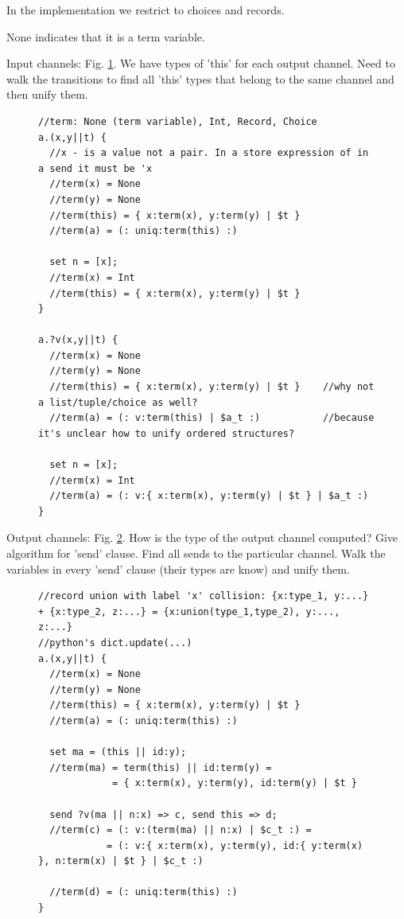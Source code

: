 In the implementation we restrict to choices and records.

None indicates that it is a term variable.


Input channels: Fig. \ref{a}.
We have types of 'this' for each output channel.
Need to walk the transitions to find all 'this' types that belong to the same channel and then unify them.
\begin{figure}[h!]
\begin{lstlisting}
//term: None (term variable), Int, Record, Choice
a.(x,y||t) {
  //x - is a value not a pair. In a store expression of in a send it must be 'x
  //term(x) = None
  //term(y) = None
  //term(this) = { x:term(x), y:term(y) | $t }
  //term(a) = (: uniq:term(this) :)

  set n = [x];
  //term(x) = Int
  //term(this) = { x:term(x), y:term(y) | $t }
}

a.?v(x,y||t) {
  //term(x) = None
  //term(y) = None
  //term(this) = { x:term(x), y:term(y) | $t }    //why not a list/tuple/choice as well?
  //term(a) = (: v:term(this) | $a_t :)           //because it's unclear how to unify ordered structures?

  set n = [x];
  //term(x) = Int
  //term(a) = (: v:{ x:term(x), y:term(y) | $t } | $a_t :)
}
\end{lstlisting}
\label{a}
\end{figure}

Output channels: Fig. \ref{b}.
How is the type of the output channel computed? Give algorithm for 'send' clause.
Find all sends to the particular channel.
Walk the variables in every 'send' clause (their types are know) and unify them.
\begin{figure}[h!]
\begin{lstlisting}[frame=single]
//record union with label 'x' collision: {x:type_1, y:...} + {x:type_2, z:...} = {x:union(type_1,type_2), y:..., z:...}
//python's dict.update(...)
a.(x,y||t) {
  //term(x) = None
  //term(y) = None
  //term(this) = { x:term(x), y:term(y) | $t }
  //term(a) = (: uniq:term(this) :)

  set ma = (this || id:y);
  //term(ma) = term(this) || id:term(y) =
             = { x:term(x), y:term(y), id:term(y) | $t }

  send ?v(ma || n:x) => c, send this => d;
  //term(c) = (: v:(term(ma) || n:x) | $c_t :) =
            = (: v:{ x:term(x), y:term(y), id:{ y:term(x) }, n:term(x) | $t } | $c_t :)

  //term(d) = (: uniq:term(this) :)
}
\end{lstlisting}
\label{b}
\end{figure}


